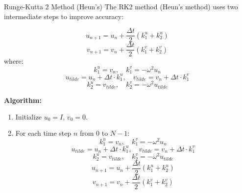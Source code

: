 \documentclass[10pt, aspectratio=54]{beamer}
\begin{document}
\begin{frame}{Runge-Kutta 2 Method (Heun's)}
	\justifying
	The RK2 method (Heun's method) uses two intermediate steps to improve accuracy:
	
	\[
	u_{n+1} = u_n + \frac{\Delta t}{2} (k_1^u + k_2^u)
	\]
	\[
	v_{n+1} = v_n + \frac{\Delta t}{2} (k_1^v + k_2^v)
	\]
	where:
	\[
	k_1^u = v_n, \quad k_1^v = -\omega^2 u_n
	\]
	\[
	u_{tilde} = u_n + \Delta t \cdot k_1^u, \quad v_{tilde} = v_n + \Delta t \cdot k_1^v
	\]
	\[
	k_2^u = v_{tilde}, \quad k_2^v = -\omega^2 u_{tilde}
	\]
	
	\textbf{Algorithm:}
	\begin{enumerate}
		\item Initialize \( u_0 = I \), \( v_0 = 0 \).
		\item For each time step \( n \) from 0 to \( N-1 \):
		\[
		k_1^u = v_n, \quad k_1^v = -\omega^2 u_n
		\]
		\[
		u_{tilde} = u_n + \Delta t \cdot k_1^u, \quad v_{tilde} = v_n + \Delta t \cdot k_1^v
		\]
		\[
		k_2^u = v_{tilde}, \quad k_2^v = -\omega^2 u_{tilde}
		\]
		\[
		u_{n+1} = u_n + \frac{\Delta t}{2} (k_1^u + k_2^u)
		\]
		\[
		v_{n+1} = v_n + \frac{\Delta t}{2} (k_1^v + k_2^v)
		\]
	\end{enumerate}
\end{frame}

%	
%	
\end{document}
